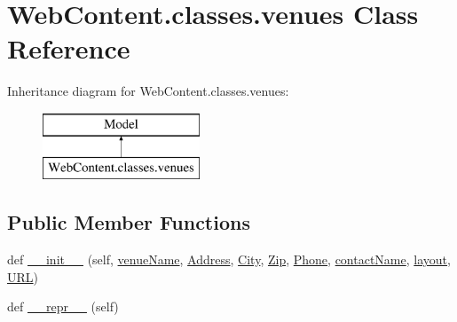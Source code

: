 \hypertarget{class_web_content_1_1classes_1_1venues}{}\section{Web\+Content.\+classes.\+venues Class Reference}
\label{class_web_content_1_1classes_1_1venues}
Inheritance diagram for Web\+Content.\+classes.\+venues\+:\begin{figure}[H]
\begin{center}
\leavevmode
\includegraphics[height=2.000000cm]{class_web_content_1_1classes_1_1venues}
\end{center}
\end{figure}
\subsection*{Public Member Functions}
\begin{DoxyCompactItemize}
\item 
def \hyperlink{class_web_content_1_1classes_1_1venues_ad7ff0f4c4610450e6d2afb55ebab01cb}{\+\_\+\+\_\+init\+\_\+\+\_\+} (self, \hyperlink{class_web_content_1_1classes_1_1venues_a9b9a18b684f7b9e71a8068443cd008d2}{venue\+Name}, \hyperlink{class_web_content_1_1classes_1_1venues_a5e482b9cf50927587cd0940be0a65eb4}{Address}, \hyperlink{class_web_content_1_1classes_1_1venues_a1575dda3b6e4b1ba7b89b03e31cfb0c9}{City}, \hyperlink{class_web_content_1_1classes_1_1venues_ac3846ed9b5b20948852b9374dd35fd22}{Zip}, \hyperlink{class_web_content_1_1classes_1_1venues_a5bf3b821cbc920a6f970c36577a451a4}{Phone}, \hyperlink{class_web_content_1_1classes_1_1venues_a2bcc906a39635f4e154cff0a5d1070ad}{contact\+Name}, \hyperlink{class_web_content_1_1classes_1_1venues_a68472a0e51533d6ee114f3668e262bd6}{layout}, \hyperlink{class_web_content_1_1classes_1_1venues_a4c87fdcce94a8d92e888b0ef112da682}{U\+RL})
\item 
def \hyperlink{class_web_content_1_1classes_1_1venues_a1c806e25e7eb1c18ba58a51817120f00}{\+\_\+\+\_\+repr\+\_\+\+\_\+} (self)
\end{DoxyCompactItemize}
